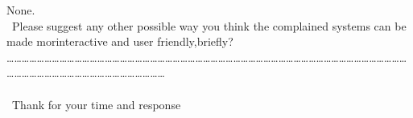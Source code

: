 \documentclass[10pt]{report}
\begin{document}
\begin{enumerate}
None.
\\\
Please suggest any other possible way you think the complained systems can be made morinteractive and user friendly,briefly?
……………………………………………………………………………………………………………………………………………………………………………………………………
\\\
\\\
Thank for your time and response






\end{enumerate}
\end{document}

